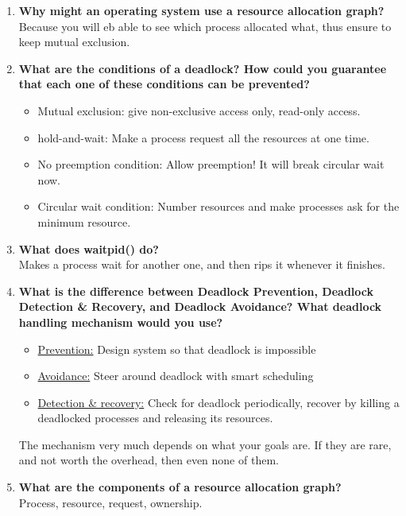 \documentclass[a4paper]{article}
\begin{document}
\begin{enumerate}
  \item {\bf Why might an operating system use a resource allocation graph? } \\
    Because you will eb able to see which process allocated what, thus ensure to keep mutual exclusion.

  \item {\bf What are the conditions of a deadlock? How could you guarantee that each one of these conditions can be prevented? }\\
    \begin{itemize}
      \item Mutual exclusion: give non-exclusive access only, read-only access.
      \item hold-and-wait: Make a process request all the resources at one time. 
      \item No preemption condition: Allow preemption! It will break circular wait now.
      \item Circular wait condition: Number resources and make processes ask for the minimum resource.
    \end{itemize}

    \item {\bf What does waitpid() do? } \\
      Makes a process wait for another one, and then rips it whenever it finishes.

  \item {\bf What is the difference between Deadlock Prevention, Deadlock Detection \& Recovery, and Deadlock Avoidance? What deadlock handling mechanism would you use? } \\
    \begin{itemize}
      \item \underline{Prevention:} Design system so that deadlock is impossible
      \item \underline{Avoidance:} Steer around deadlock with smart scheduling
      \item \underline{Detection \& recovery:} Check for deadlock periodically, recover by killing a deadlocked processes and releasing its resources. 
    \end{itemize}
    The mechanism very much depends on what your goals are. If they are rare, and not worth the overhead, then even none of them.

  \item {\bf What are the components of a resource allocation graph?}\\
    Process, resource, request, ownership.


\end{enumerate}
\end{document}
